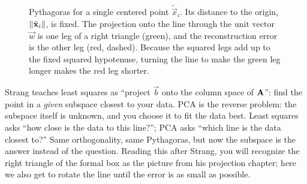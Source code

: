 \begin{figure}[H]
\centering
{}
\caption{Pythagoras for a single centered point $\tilde{\vec x}_i$.
Its distance to the origin, $\lVert\tilde{\mathbf{x}}_i\rVert$, is fixed. The projection onto
the line through the unit vector $\vec w$ is one leg of a right triangle (green), and
the reconstruction error is the other leg (red, dashed). Because the squared legs
add up to the fixed squared hypotenuse, turning the line to make the green leg longer
makes the red leg shorter.}
\label{ch30:pythagoras}
\end{figure}

\begin{strangbox}
Strang teaches least squares as ``project $\vec b$ onto the column space of $\mathbf{A}$'': find the point in a \emph{given} subspace closest to your data. PCA is the
reverse problem: the subspace itself is unknown, and you choose it to fit
the data best. Least squares asks ``how close is the data to this line?''; PCA asks
``which line is the data closest to?'' Same orthogonality, same Pythagoras, but now
the subspace is the answer instead of the question. Reading this after Strang, you
will recognize the right triangle of the formal box as the picture from his
projection chapter; here we also get to rotate the line until the error is as small
as possible.
\end{strangbox}

